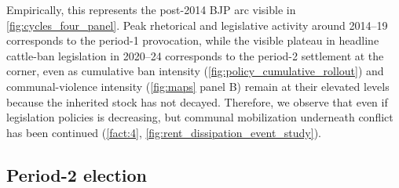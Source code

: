 \documentclass[11pt,twoside]{extarticle}
\begin{document}
Empirically, this represents the post-2014 BJP arc visible in \autoref{fig:cycles_four_panel}. Peak rhetorical and legislative activity around 2014--19 corresponds to the period-1 provocation, while the visible plateau in headline cattle-ban legislation in 2020--24 corresponds to the period-2 settlement at the corner, even as cumulative ban intensity (\autoref{fig:policy_cumulative_rollout}) and communal-violence intensity (\autoref{fig:maps} panel B) remain at their elevated levels because the inherited stock has not decayed.
Therefore, we observe that even if legislation policies is decreasing, but communal mobilization underneath conflict has been continued (\autoref{fact:4}, \autoref{fig:rent_dissipation_event_study}). 

\subsection{Period-2 election}\label{subsec:swing_v3}
\end{document}
